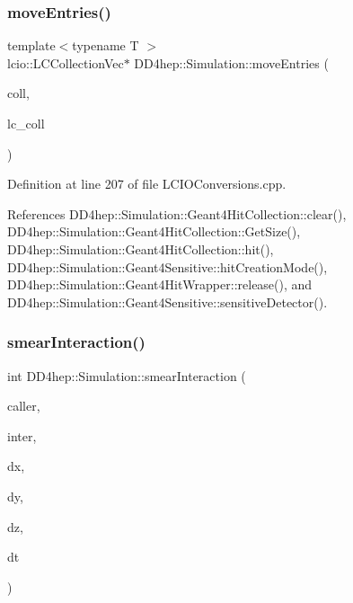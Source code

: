 \subsubsection{\texorpdfstring{move\+Entries()}{moveEntries()}}
{\footnotesize\ttfamily template$<$typename T $>$ \\
lcio\+::\+L\+C\+Collection\+Vec$\ast$ D\+D4hep\+::\+Simulation\+::move\+Entries (\begin{DoxyParamCaption}\item[{\hyperlink{class_d_d4hep_1_1_simulation_1_1_geant4_hit_collection}{Geant4\+Hit\+Collection} $\ast$}]{coll,  }\item[{lcio\+::\+L\+C\+Collection\+Vec $\ast$}]{lc\+\_\+coll }\end{DoxyParamCaption})}



Definition at line 207 of file L\+C\+I\+O\+Conversions.\+cpp.



References D\+D4hep\+::\+Simulation\+::\+Geant4\+Hit\+Collection\+::clear(), D\+D4hep\+::\+Simulation\+::\+Geant4\+Hit\+Collection\+::\+Get\+Size(), D\+D4hep\+::\+Simulation\+::\+Geant4\+Hit\+Collection\+::hit(), D\+D4hep\+::\+Simulation\+::\+Geant4\+Sensitive\+::hit\+Creation\+Mode(), D\+D4hep\+::\+Simulation\+::\+Geant4\+Hit\+Wrapper\+::release(), and D\+D4hep\+::\+Simulation\+::\+Geant4\+Sensitive\+::sensitive\+Detector().

\hypertarget{namespace_d_d4hep_1_1_simulation_a139e5502767fe9672b4d32c1e276aec3}{}\label{namespace_d_d4hep_1_1_simulation_a139e5502767fe9672b4d32c1e276aec3} 
\subsubsection{\texorpdfstring{smear\+Interaction()}{smearInteraction()}}
{\footnotesize\ttfamily int D\+D4hep\+::\+Simulation\+::smear\+Interaction (\begin{DoxyParamCaption}\item[{const \hyperlink{class_d_d4hep_1_1_simulation_1_1_geant4_action}{Geant4\+Action} $\ast$}]{caller,  }\item[{\hyperlink{class_d_d4hep_1_1_simulation_1_1_geant4_primary_event_afe42410b9331b521808a49120f402bd9}{Geant4\+Primary\+Event\+::\+Interaction} $\ast$}]{inter,  }\item[{double}]{dx,  }\item[{double}]{dy,  }\item[{double}]{dz,  }\item[{double}]{dt }\end{DoxyParamCaption})}




